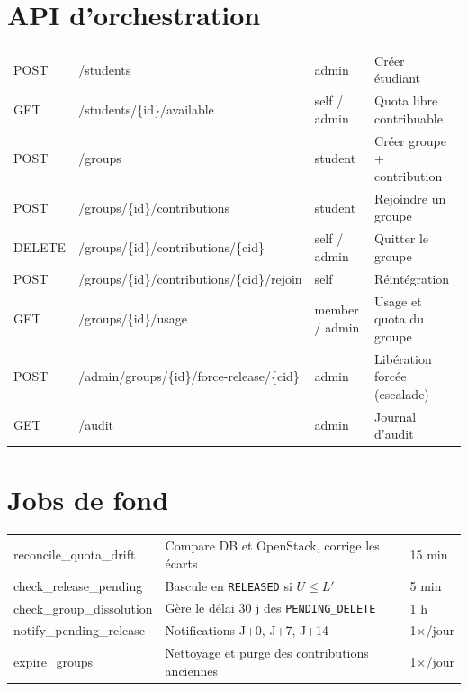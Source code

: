 \section{API d'orchestration}
\begin{xltabular}{\textwidth}{@{}lllX@{}}
\toprule
{} &  &  &  \\
\midrule
\endhead
\bottomrule
\endfoot
\bottomrule
\endlastfoot
POST   & /students                                 & admin        & Créer étudiant \\
GET    & /students/\{id\}/available                & self / admin & Quota libre contribuable \\
POST   & /groups                                   & student      & Créer groupe + contribution \\
POST   & /groups/\{id\}/contributions              & student      & Rejoindre un groupe \\
DELETE & /groups/\{id\}/contributions/\{cid\}      & self / admin & Quitter le groupe \\
POST   & /groups/\{id\}/contributions/\{cid\}/rejoin & self       & Réintégration \\
GET    & /groups/\{id\}/usage                      & member / admin & Usage et quota du groupe \\
POST   & /admin/groups/\{id\}/force-release/\{cid\} & admin       & Libération forcée (escalade) \\
GET    & /audit                                    & admin        & Journal d'audit \\

\end{xltabular}

\section{Jobs de fond}
\begin{xltabular}{\textwidth}{@{}lXl@{}}
\toprule
{} &  &  \\
\midrule
\endhead
\bottomrule
\endfoot
\bottomrule
\endlastfoot
reconcile\_quota\_drift    & Compare DB et OpenStack, corrige les écarts & 15 min \\
check\_release\_pending    & Bascule en \texttt{RELEASED} si $U \leq L'$ & 5 min \\
check\_group\_dissolution  & Gère le délai 30 j des \texttt{PENDING\_DELETE} & 1 h \\
notify\_pending\_release   & Notifications J+0, J+7, J+14 & 1×/jour \\
expire\_groups             & Nettoyage et purge des contributions anciennes & 1×/jour \\

\end{xltabular}

